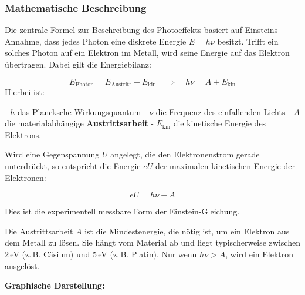 \subsubsection{Mathematische Beschreibung}

Die zentrale Formel zur Beschreibung des Photoeffekts basiert auf Einsteins Annahme, dass jedes Photon eine diskrete Energie \( E = h\nu \) besitzt. Trifft ein solches Photon auf ein Elektron im Metall, wird seine Energie auf das Elektron übertragen. Dabei gilt die Energiebilanz:

\[
E_{\text{Photon}} = E_{\text{Austritt}} + E_{\text{kin}}
\quad\Rightarrow\quad h \nu = A + E_{\text{kin}}
\]
\newpage
\noindent
Hierbei ist:

- \( h \) das Plancksche Wirkungsquantum  
- \( \nu \) die Frequenz des einfallenden Lichts  
- \( A \) die materialabhängige \textbf{Austrittsarbeit}  
- \( E_{\text{kin}} \) die kinetische Energie des Elektrons.

Wird eine Gegenspannung \( U \) angelegt, die den Elektronenstrom gerade unterdrückt, so entspricht die Energie \( e U \) der maximalen kinetischen Energie der Elektronen:

\[
eU = h \nu - A
\]

Dies ist die experimentell messbare Form der Einstein-Gleichung.

\vspace{0.5em}
\begin{tcolorbox}[physikbox, title=Was ist die Austrittsarbeit \( A \)?]
	\label{bos:was ist Austrittsarbeit}
	\small
	Die Austrittsarbeit \( A \) ist die Mindestenergie, die nötig ist, um ein Elektron aus dem Metall zu lösen. Sie hängt vom Material ab und liegt typischerweise zwischen 2\,eV (z.\,B. Cäsium) und 5\,eV (z.\,B. Platin). Nur wenn \( h \nu > A \), wird ein Elektron ausgelöst.
\end{tcolorbox}
\vspace{1em}
\textbf{Graphische Darstellung:}

